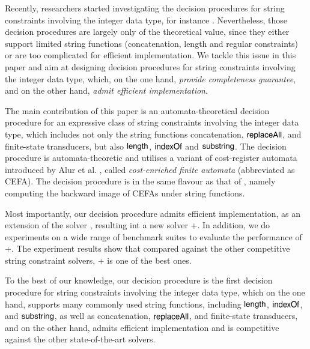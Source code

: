 Recently, researchers started investigating the decision procedures for string constraints involving the integer data type, for instance \cite{Vijay-length,L16,LinM18,LB16}. Nevertheless, those decision procedures are largely only of the theoretical value, since they either support limited string functions (concatenation, length and regular constraints) or are too complicated for efficient implementation. We tackle this issue in this paper and aim at designing decision procedures for string constraints involving the integer data type, which, on the one hand, \emph{provide completeness guarantee}, and on the other hand, \emph{admit efficient implementation}.

The main contribution of this paper is an automata-theoretical decision procedure for an expressive class of string constraints involving the integer data type, which includes not only the string functions concatenation, $\mathsf{replaceAll}$, and finite-state transducers, but also $\mathsf{length}$, $\mathsf{indexOf}$ and $\mathsf{substring}$. The decision procedure is automata-theoretic and utilises a variant of cost-register automata introduced by Alur et al. \cite{RLJ+13}, called \emph{cost-enriched finite automata} (abbreviated as CEFA). The decision procedure is in the same flavour as that of {\ostrich} \cite{CHL+19}, namely computing the backward image of CEFAs under string functions. 

Most importantly, our decision procedure admits efficient implementation, as an extension of the {\ostrich} solver \cite{CHL+19}, resulting int a new solver {\ostrich}+.  In addition, we do experiments on a wide range of benchmark suites to evaluate the performance of {\ostrich}+. The experiment results show that compared against the other competitive string constraint solvers, {\ostrich}+ is one of the best ones. 

To the best of our knowledge, our decision procedure is the first decision procedure for string constraints involving the integer data type, which on the one hand, supports many commonly used string functions, including $\mathsf{length}$, $\mathsf{indexOf}$, and $\mathsf{substring}$,  as well as concatenation, $\mathsf{replaceAll}$, and finite-state transducers, and on the other hand, admits efficient implementation and is competitive against the other state-of-the-art solvers.



